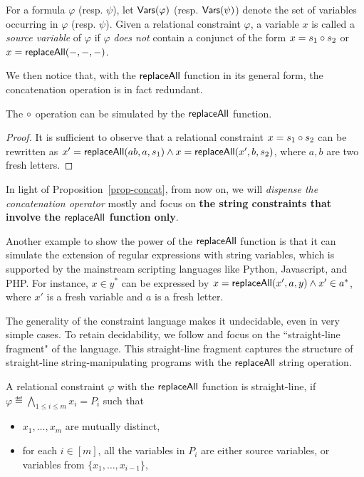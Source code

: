 For a formula $\varphi$ (resp. $\psi$), let $\mathsf{Vars}(\varphi)$ (resp. $\mathsf{Vars}(\psi)$) denote the set of variables occurring in $\varphi$ (resp. $\psi$). Given a relational constraint $\varphi$, a variable $x$ is called a \emph{source variable} of $\varphi$ if $\varphi$ \emph{does not} contain a conjunct of the form $x = s_1 \circ s_2$ or $x = \mathsf{replaceAll}(-,-,-)$.

We then notice that, with the $\mathsf{replaceAll}$ function in its general form, the concatenation operation is in fact redundant.

\begin{proposition}\label{prop-concat}
	The $\circ$ operation can be simulated  by the $\mathsf{replaceAll}$ function.
\end{proposition}
\begin{proof}
	It is sufficient to observe that %
	a relational constraint $x = s_1 \circ s_2$ can be rewritten as $x' = \mathsf{replaceAll}(ab, a, s_1) \wedge x = \mathsf{replaceAll}(x', b, s_2)$, where $a,b$ are two fresh letters.
\end{proof}

In light of Proposition~\ref{prop-concat}, from now on, we will \emph{dispense the concatenation operator} mostly and focus on \textbf{the string constraints that involve  the $\mathsf{replaceAll}$ function only}.

Another example to show the power of the $\mathsf{replaceAll}$ function is that it can simulate the extension of regular expressions with string variables, which is  supported by the mainstream scripting languages like Python, Javascript, and PHP. For instance, $x \in y^*$ can be expressed by $x =\mathsf{replaceAll}(x', a, y) \wedge x' \in a^*$, where $x'$ is a fresh variable and $a$ is a fresh letter. 


\medskip

The generality of the constraint language makes it undecidable,
even in very simple cases. To retain decidability, we follow \cite{LB16} and focus on the ``straight-line fragment" of the language. This straight-line fragment captures the structure of straight-line string-manipulating
programs with the $\mathsf{replaceAll}$ string operation.  

\begin{definition}
	A relational constraint $ \varphi$ with the $\mathsf{replaceAll}$ function is straight-line, if $\varphi \eqdef \bigwedge \limits_{1 \le i \le m} x_i = P_i$ such that
	\begin{itemize}
		\item $x_1,\dots, x_m$ are mutually distinct,
		\item for each $i \in [m]$, all the variables in $P_i$ are either source variables, or variables from $\{x_1,\dots, x_{i-1}\}$,
	\end{itemize}
\end{definition}

